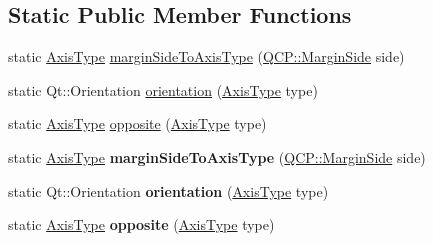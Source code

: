 \subsection*{Static Public Member Functions}
\begin{DoxyCompactItemize}
\item 
static \hyperlink{class_q_c_p_axis_ae2bcc1728b382f10f064612b368bc18a}{Axis\+Type} \hyperlink{class_q_c_p_axis_ac0a6b77bd52bec6c81cd62d167cfeba6}{margin\+Side\+To\+Axis\+Type} (\hyperlink{namespace_q_c_p_a7e487e3e2ccb62ab7771065bab7cae54}{Q\+C\+P\+::\+Margin\+Side} side)
\item 
static Qt\+::\+Orientation \hyperlink{class_q_c_p_axis_a9a68b3e45f1b1e33d4d807822342516c}{orientation} (\hyperlink{class_q_c_p_axis_ae2bcc1728b382f10f064612b368bc18a}{Axis\+Type} type)
\item 
static \hyperlink{class_q_c_p_axis_ae2bcc1728b382f10f064612b368bc18a}{Axis\+Type} \hyperlink{class_q_c_p_axis_aa85ba73dfee6483e23825461b725e363}{opposite} (\hyperlink{class_q_c_p_axis_ae2bcc1728b382f10f064612b368bc18a}{Axis\+Type} type)
\item 
static \hyperlink{class_q_c_p_axis_ae2bcc1728b382f10f064612b368bc18a}{Axis\+Type} {\bfseries margin\+Side\+To\+Axis\+Type} (\hyperlink{namespace_q_c_p_a7e487e3e2ccb62ab7771065bab7cae54}{Q\+C\+P\+::\+Margin\+Side} side)\hypertarget{class_q_c_p_axis_aad1924683216301698cfe1ed43c799c4}{}\label{class_q_c_p_axis_aad1924683216301698cfe1ed43c799c4}

\item 
static Qt\+::\+Orientation {\bfseries orientation} (\hyperlink{class_q_c_p_axis_ae2bcc1728b382f10f064612b368bc18a}{Axis\+Type} type)\hypertarget{class_q_c_p_axis_a9a68b3e45f1b1e33d4d807822342516c}{}\label{class_q_c_p_axis_a9a68b3e45f1b1e33d4d807822342516c}

\item 
static \hyperlink{class_q_c_p_axis_ae2bcc1728b382f10f064612b368bc18a}{Axis\+Type} {\bfseries opposite} (\hyperlink{class_q_c_p_axis_ae2bcc1728b382f10f064612b368bc18a}{Axis\+Type} type)\hypertarget{class_q_c_p_axis_aa22c33f3afe169962dc7abdbcd7d45d8}{}\label{class_q_c_p_axis_aa22c33f3afe169962dc7abdbcd7d45d8}

\end{DoxyCompactItemize}
